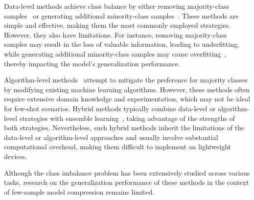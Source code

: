 Data-level methods achieve class balance by either removing majority-class samples~\citep{liu2008exploratory,lin2017clustering,mohammed2020machine} or generating additional minority-class samples~\citep{chawla2002smote,sharma2022review,abdi2015combat}. These methods are simple and effective, making them the most commonly employed strategies. However, they also have limitations. For instance, removing majority-class samples may result in the loss of valuable information, leading to underfitting, while generating additional minority-class samples may cause overfitting~\citep{zhou2020bbn}, thereby impacting the model's generalization performance. 

Algorithm-level methods~\citep{zhou2005training,fernandez2018cost,he2024multi} attempt to mitigate the preference for majority classes by modifying existing machine learning algorithms. However, these methods often require extensive domain knowledge and experimentation, which may not be ideal for few-shot scenarios. Hybrid methods typically combine data-level or algorithm-level strategies with ensemble learning~\citep{galar2011review,chawla2003smoteboost}, taking advantage of the strengths of both strategies. Nevertheless, such hybrid methods inherit the limitations of the data-level or algorithm-level approaches and usually involve substantial computational overhead, making them difficult to implement on lightweight devices.

Although the class imbalance problem has been extensively studied across various tasks, research on the generalization performance of these methods in the context of few-sample model compression remains limited.
